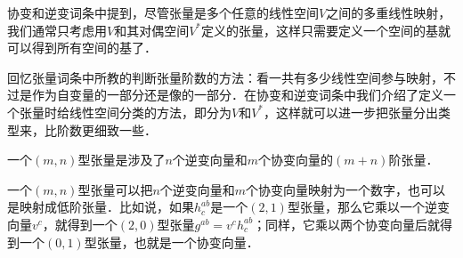 
\begin{issues}
\issueDraft
\end{issues}


协变和逆变词条中提到，尽管张量是多个任意的线性空间$V$之间的多重线性映射，我们通常只考虑用$V$和其对偶空间$V^*$定义的张量，这样只需要定义一个空间的基就可以得到所有空间的基了．

回忆张量词条中所教的判断张量阶数的方法：看一共有多少线性空间参与映射，不过是作为自变量的一部分还是像的一部分．在协变和逆变词条中我们介绍了定义一个张量时给线性空间分类的方法，即分为$V$和$V^*$，这样就可以进一步把张量分出类型来，比阶数更细致一些．

\begin{definition}{}
一个$(m, n)$型张量是涉及了$n$个逆变向量和$m$个协变向量的$(m+n)$阶张量．
\end{definition}

一个$(m, n)$型张量可以把$n$个逆变向量和$m$个协变向量映射为一个数字，也可以是映射成低阶张量．比如说，如果$h^{ab}_c$是一个$(2, 1)$型张量，那么它乘以一个逆变向量$v^c$，就得到一个$(2, 0)$型张量$g^{ab}=v^ch^{ab}_c$；同样，它乘以两个协变向量后就得到一个$(0, 1)$型张量，也就是一个协变向量．









